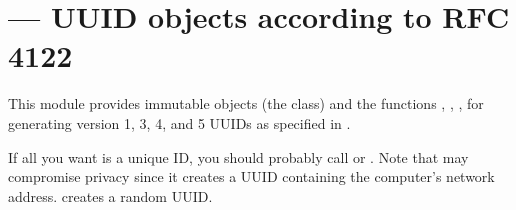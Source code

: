 \section{ ---
         UUID objects according to RFC 4122}


This module provides immutable  objects (the  class)
and the functions , ,
,  for generating version 1, 3, 4,
and 5 UUIDs as specified in .

If all you want is a unique ID, you should probably call
 or .  Note that 
may compromise privacy since it creates a UUID containing the computer's
network address.   creates a random UUID.

